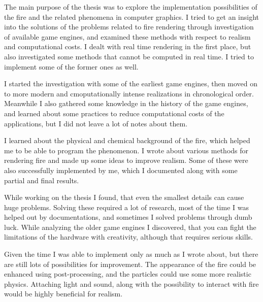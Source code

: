 

The main purpose of the thesis was to explore the implementation possibilities of the fire and the related phenomena in computer graphics. I tried to get an insight into the solutions of the problems related to fire rendering through investigation of available game engines, and examined these methods with respect to realism and computational costs. I dealt with real time rendering in the first place, but also investigated some methods that cannot be computed in real time. I tried to implement some of the former ones as well.

I started the investigation with some of the earliest game engines, then moved on to more modern and cmoputationally intense realizations in chronological order. Meanwhile I also gathered some knowledge in the history of the game engines, and learned about some practices to reduce computational costs of the applications, but I did not leave a lot of notes about them. 

I learned about the physical and chemical background of the fire, which helped me to be able to program the phenomenon. I wrote about various methods for rendering fire and made up some ideas to improve realism. Some of these were also successfully implemented by me, which I documented along with some partial and final results.

While working on the thesis I found, that even the smallest details can cause huge problems. Solving these required a lot of research, most of the time I was helped out by documentations, and sometimes I solved problems through dumb luck. While analyzing the older game engines I discovered, that you can fight the limitations of the hardware with creativity, although that requires serious skills.

Given the time I was able to implement only as much as I wrote about, but there are still lots of possibilities for improvement. The appearance of the fire could be enhanced using post-processing, and the particles could use some more realistic physics. Attaching light and sound, along with the possibility to interact with fire would be highly beneficial for realism.

